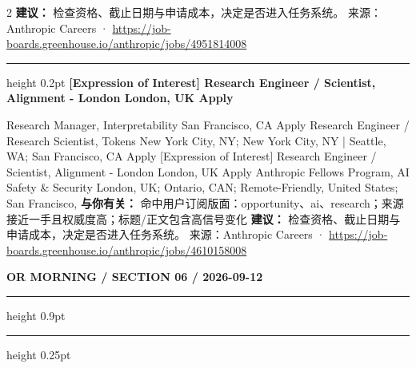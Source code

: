 \documentclass[10.5pt]{ctexart}
\begin{document}
\begin{multicols}{2}
\textbf{建议：} 检查资格、截止日期与申请成本，决定是否进入任务系统。
{\footnotesize\color{ormuted} 来源：Anthropic Careers · \url{https://job-boards.greenhouse.io/anthropic/jobs/4951814008}}
\vspace{2mm}
\hrule height 0.2pt
\vspace{2mm}
{\large\bfseries [Expression of Interest] Research Engineer / Scientist, Alignment - London London, UK Apply}\par
[Expression of Interest] Research Manager, Interpretability San Francisco, CA Apply Research Engineer / Research Scientist, Tokens New York City, NY; New York City, NY | Seattle, WA; San Francisco, CA Apply [Expression of Interest] Research Engineer / Scientist, Alignment - London London, UK Apply Anthropic Fellows Program, AI Safety \& Security London, UK; Ontario, CAN; Remote-Friendly, United States; San Francisco, 
\textbf{与你有关：} 命中用户订阅版面：opportunity、ai、research；来源接近一手且权威度高；标题/正文包含高信号变化
\textbf{建议：} 检查资格、截止日期与申请成本，决定是否进入任务系统。
{\footnotesize\color{ormuted} 来源：Anthropic Careers · \url{https://job-boards.greenhouse.io/anthropic/jobs/4610158008}}
\end{multicols}
\newpage
{\small\bfseries OR MORNING / SECTION 06 / 2026-09-12}
\vspace{2mm}
\hrule height 0.9pt
\vspace{1.5mm}
\hrule height 0.25pt
\vspace{4mm}
\end{document}
